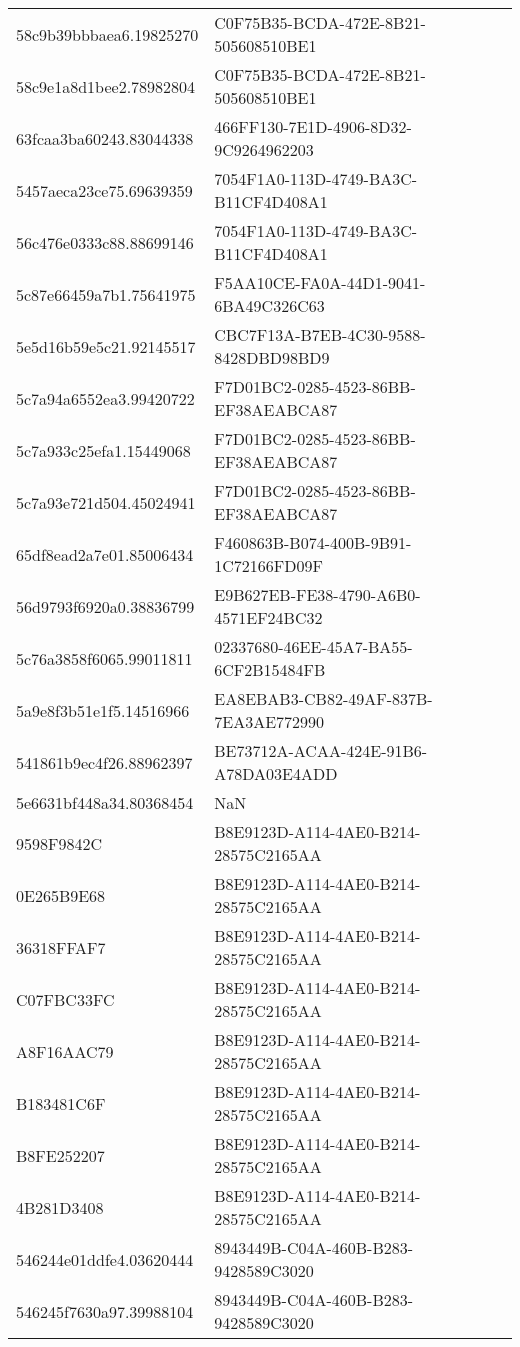 \begin{tabular}{ll}
58c9b39bbbaea6.19825270 & C0F75B35-BCDA-472E-8B21-505608510BE1 \\
58c9e1a8d1bee2.78982804 & C0F75B35-BCDA-472E-8B21-505608510BE1 \\
63fcaa3ba60243.83044338 & 466FF130-7E1D-4906-8D32-9C9264962203 \\
5457aeca23ce75.69639359 & 7054F1A0-113D-4749-BA3C-B11CF4D408A1 \\
56c476e0333c88.88699146 & 7054F1A0-113D-4749-BA3C-B11CF4D408A1 \\
5c87e66459a7b1.75641975 & F5AA10CE-FA0A-44D1-9041-6BA49C326C63 \\
5e5d16b59e5c21.92145517 & CBC7F13A-B7EB-4C30-9588-8428DBD98BD9 \\
5c7a94a6552ea3.99420722 & F7D01BC2-0285-4523-86BB-EF38AEABCA87 \\
5c7a933c25efa1.15449068 & F7D01BC2-0285-4523-86BB-EF38AEABCA87 \\
5c7a93e721d504.45024941 & F7D01BC2-0285-4523-86BB-EF38AEABCA87 \\
65df8ead2a7e01.85006434 & F460863B-B074-400B-9B91-1C72166FD09F \\
56d9793f6920a0.38836799 & E9B627EB-FE38-4790-A6B0-4571EF24BC32 \\
5c76a3858f6065.99011811 & 02337680-46EE-45A7-BA55-6CF2B15484FB \\
5a9e8f3b51e1f5.14516966 & EA8EBAB3-CB82-49AF-837B-7EA3AE772990 \\
541861b9ec4f26.88962397 & BE73712A-ACAA-424E-91B6-A78DA03E4ADD \\
5e6631bf448a34.80368454 & NaN \\
9598F9842C & B8E9123D-A114-4AE0-B214-28575C2165AA \\
0E265B9E68 & B8E9123D-A114-4AE0-B214-28575C2165AA \\
36318FFAF7 & B8E9123D-A114-4AE0-B214-28575C2165AA \\
C07FBC33FC & B8E9123D-A114-4AE0-B214-28575C2165AA \\
A8F16AAC79 & B8E9123D-A114-4AE0-B214-28575C2165AA \\
B183481C6F & B8E9123D-A114-4AE0-B214-28575C2165AA \\
B8FE252207 & B8E9123D-A114-4AE0-B214-28575C2165AA \\
4B281D3408 & B8E9123D-A114-4AE0-B214-28575C2165AA \\
546244e01ddfe4.03620444 & 8943449B-C04A-460B-B283-9428589C3020 \\
546245f7630a97.39988104 & 8943449B-C04A-460B-B283-9428589C3020 \\

\end{tabular}
